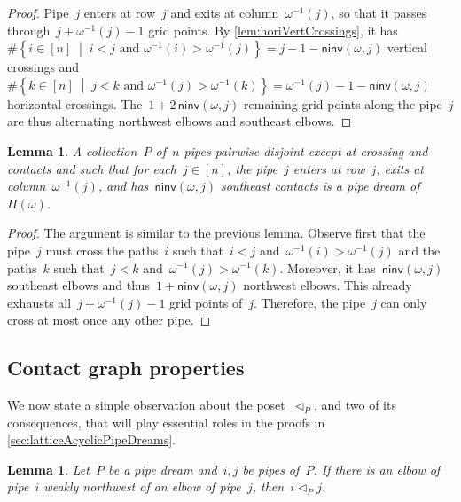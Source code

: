 \documentclass{amsart}
\newtheorem{lemma}[theorem]{Lemma}
\theoremstyle{definition}
\newcommand{\set}[2]{\left\{ #1 \;\middle|\; #2 \right\}} %
\newcommand{\pipeDreams}{\Pi} %
\newcommand{\noninversions}[2]{\mathsf{ninv}(#1,#2)} %
\newcommand{\less}{\vartriangleleft} %
\newcommand{\contactLess}[1]{\less_{#1}} %
\begin{document}
\begin{proof}
Pipe~$j$ enters at row~$j$ and exits at column~$\omega^{-1}(j)$, so that it passes through~$j+\omega^{-1}(j)-1$ grid points.
By \cref{lem:horiVertCrossings}, it has~$\#\set{i \in [n]}{i < j \text{ and } \omega^{-1}(i) > \omega^{-1}(j)} = j-1-\noninversions{\omega}{j}$ vertical crossings and~$\#\set{k \in [n]}{j < k \text{ and } \omega^{-1}(j) > \omega^{-1}(k)} = \omega^{-1}(j)-1-\noninversions{\omega}{j}$ horizontal crossings.
The~$1+2\,\noninversions{\omega}{j}$ remaining grid points along the pipe~$j$ are thus alternating northwest elbows and southeast elbows.
\end{proof}

\begin{lemma}
\label{lem:characterizationPipeDreams}
A collection~$P$ of~$n$ pipes pairwise disjoint except at crossing and contacts and such that for each~$j \in [n]$, the pipe~$j$ enters at row~$j$, exits at column~$\omega^{-1}(j)$, and has~$\noninversions{\omega}{j}$ southeast contacts is a pipe dream of~$\pipeDreams(\omega)$.
\end{lemma}

\begin{proof}
The argument is similar to the previous lemma.
Observe first that the pipe~$j$ must cross the paths~$i$ such that~$i < j$ and~$\omega^{-1}(i) > \omega^{-1}(j)$ and the paths~$k$ such that~$j < k$ and~$\omega^{-1}(j) > \omega^{-1}(k)$.
Moreover, it has~$\noninversions{\omega}{j}$ southeast elbows and thus~$1+\noninversions{\omega}{j}$ northwest elbows.
This already exhausts all~$j+\omega^{-1}(j)-1$ grid points of~$j$.
Therefore, the pipe~$j$ can only cross at most once any other pipe.
\end{proof}


\subsection{Contact graph properties}
\label{subsec:contactGraph}

We now state a simple observation about the poset~$\contactLess{P}$, and two of its consequences, that will play essential roles in the proofs in \cref{sec:latticeAcyclicPipeDreams}.

\begin{lemma}
\label{lem:rectangle}
Let~$P$ be a pipe dream and~$i,j$ be pipes of~$P$.
If there is an elbow of pipe~$i$ weakly northwest of an elbow of pipe~$j$, then~$i \contactLess{P} j$.
\end{lemma}
\end{document}
